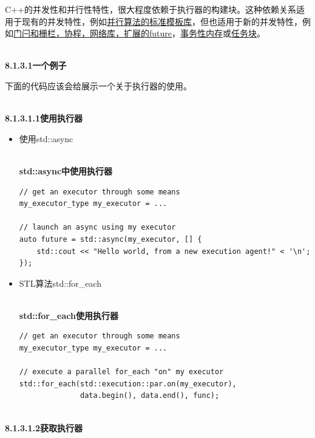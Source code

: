 C++的并发性和并行性特性，很大程度依赖于执行器的构建块。这种依赖关系适用于现有的并发特性，例如\href{https://www.modernescpp.com/index.php/parallel-algorithm-of-the-standard-template-library}{并行算法的标准模板库}，但也适用于新的并发特性，例如\href{https://www.modernescpp.com/index.php/std-future-extensions}{门闩和栅栏，协程，网络库，扩展的future}，\href{https://www.modernescpp.com/index.php/transactional-memory}{事务性内存}或\href{https://www.modernescpp.com/index.php/task-blocks}{任务块}。

\hspace*{\fill} \\ %
\noindent
\textbf{8.1.3.1\hspace{0.2cm}一个例子}

下面的代码应该会给展示一个关于执行器的使用。

\hspace*{\fill} \\ %
\noindent
\textbf{8.1.3.1.1\hspace{0.2cm}使用执行器}

\begin{itemize}
\item 
使用std::async

\hspace*{\fill} \\ %
\noindent
\textbf{std::async中使用执行器}
\begin{lstlisting}[style=styleCXX]
// get an executor through some means
my_executor_type my_executor = ...

// launch an async using my executor
auto future = std::async(my_executor, [] {
	std::cout << "Hello world, from a new execution agent!" < '\n';
});
\end{lstlisting}

\item 
STL算法std::for\_each

\hspace*{\fill} \\ %
\noindent
\textbf{std::for\_each使用执行器}
\begin{lstlisting}[style=styleCXX]
// get an executor through some means
my_executor_type my_executor = ...

// execute a parallel for_each "on" my executor
std::for_each(std::execution::par.on(my_executor),
			  data.begin(), data.end(), func);
\end{lstlisting}
\end{itemize}

\hspace*{\fill} \\ %
\noindent
\textbf{8.1.3.1.2\hspace{0.2cm}获取执行器}

